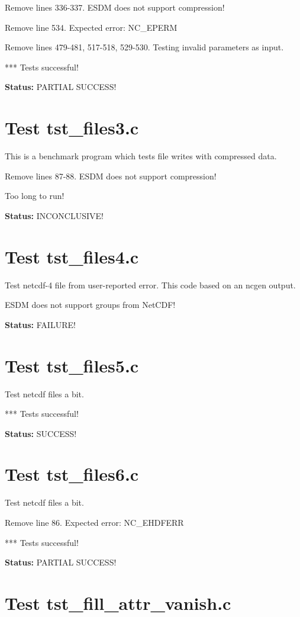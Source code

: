 Remove lines 336-337. ESDM does not support compression!

Remove line 534. Expected error: NC\_EPERM

Remove lines 479-481, 517-518, 529-530. Testing invalid parameters as input.

*** Tests successful!

{\bf \large Status: } PARTIAL SUCCESS!

\section{Test tst\_files3.c}

This is a benchmark program which tests file writes with compressed data.

Remove lines 87-88. ESDM does not support compression!

Too long to run!

{\bf \large Status: } INCONCLUSIVE!

\section{Test tst\_files4.c}

Test netcdf-4 file from user-reported error. This code based on an ncgen output.

ESDM does not support groups from NetCDF!

{\bf \large Status: } FAILURE!

\section{Test tst\_files5.c}

Test netcdf files a bit.

*** Tests successful!

{\bf \large Status: } SUCCESS!

\section{Test tst\_files6.c}

Test netcdf files a bit.

Remove line 86. Expected error: NC\_EHDFERR

*** Tests successful!

{\bf \large Status: } PARTIAL SUCCESS!

\section{Test tst\_fill\_attr\_vanish.c}

